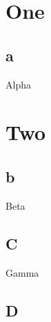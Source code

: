 \documentclass{book}
\begin{document}
\chapter{One}
\section*{a}
Alpha
\chapter{Two}
\section*{b}
Beta
\section{C}
Gamma\endnotemark
\section{D}
\printendnotes
\end{document}
